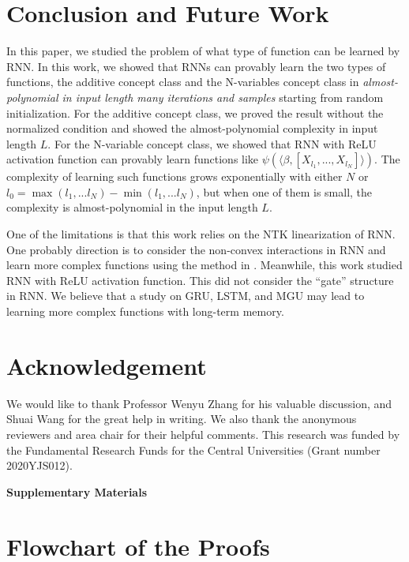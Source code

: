 \documentclass{article}
\begin{document}
\section{Conclusion and Future Work}
In this paper, we studied the problem of what type of function can be learned by RNN. In this work, we showed that RNNs can provably learn the two types of functions, the additive concept class and the N-variables concept class in \emph{almost-polynomial in input length many iterations and samples} starting from random initialization. For the additive concept class, we proved the result without the normalized condition and showed the almost-polynomial complexity in input length $L$. For the N-variable concept class, we showed that RNN with ReLU activation function can provably learn functions like $\psi(\langle \beta,[X_{l_1},...,X_{l_N}]\rangle )$. The complexity of learning such functions grows exponentially with either $N$ or $l_0=\max(l_1,...l_N)- \min(l_1,...l_N)$, but when one of them is small, the complexity is almost-polynomial in the input length $L$.

One of the limitations is that this work relies on the NTK linearization of RNN. One probably direction is to consider the non-convex interactions in RNN and learn more complex functions using the method in \cite{NEURIPS201962dad6e2}. Meanwhile, this work studied RNN with ReLU activation function. This did not consider the ``gate'' structure in RNN. We believe that a study on GRU, LSTM, and MGU may lead to learning more complex functions with long-term memory.

\section*{Acknowledgement}
We would like to thank Professor Wenyu Zhang for his valuable discussion, and Shuai Wang for the great help in writing. We also thank the anonymous reviewers and area chair for their helpful comments.
This research was funded by the Fundamental Research Funds for the Central Universities (Grant number 2020YJS012).





\newpage
\appendix
{\bf \LARGE Supplementary Materials}

\section{Flowchart of the Proofs}
\end{document}
